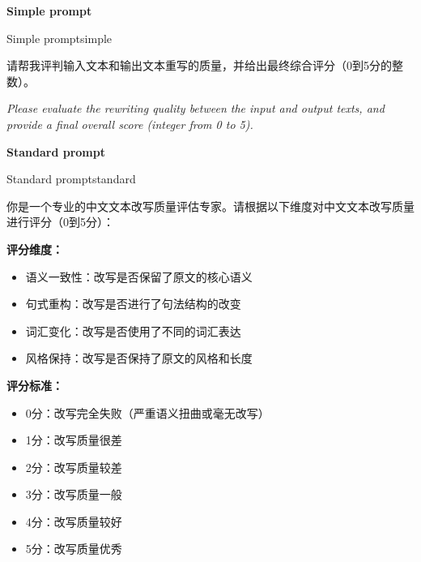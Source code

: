 \documentclass[11pt]{article}
\begin{document}
\begin{table}[h]
\centering
\caption{Effect of prompt granularity on evaluation quality (Qwen3-8B, balanced training).}
\label{tab:prompt_granularity}
\end{table}

\begin{table}[h!]
\medskip
\noindent\textbf{Simple prompt}
\medskip
\begin{prompttextbox}{Simple prompt}{simple}
\small
\begin{minipage}[t]{0.47\linewidth}
请帮我评判输入文本和输出文本重写的质量，并给出最终综合评分（0到5分的整数）。
\end{minipage}%
\hfill\vrule\hfill%
\begin{minipage}[t]{0.47\linewidth}
\textit{Please evaluate the rewriting quality between the input and output texts, and provide a final overall score (integer from 0 to 5).}
\end{minipage}
\end{prompttextbox}


\medskip
\noindent\textbf{Standard prompt}
\medskip
\begin{prompttextbox}{Standard prompt}{standard}
\small
\begin{minipage}[t]{0.47\linewidth}
你是一个专业的中文文本改写质量评估专家。请根据以下维度对中文文本改写质量进行评分（0到5分）：

\medskip\textbf{评分维度：}
\begin{itemize}[leftmargin=1.2em,itemsep=0pt,topsep=2pt]
  \item 语义一致性：改写是否保留了原文的核心语义
  \item 句式重构：改写是否进行了句法结构的改变
  \item 词汇变化：改写是否使用了不同的词汇表达
  \item 风格保持：改写是否保持了原文的风格和长度
\end{itemize}

\medskip\textbf{评分标准：}
\begin{itemize}[leftmargin=1.2em,itemsep=0pt,topsep=2pt]
  \item 0分：改写完全失败（严重语义扭曲或毫无改写）
  \item 1分：改写质量很差
  \item 2分：改写质量较差
  \item 3分：改写质量一般
  \item 4分：改写质量较好
  \item 5分：改写质量优秀
\end{itemize}


\end{minipage}
\end{prompttextbox}
\end{table}
\end{document}
